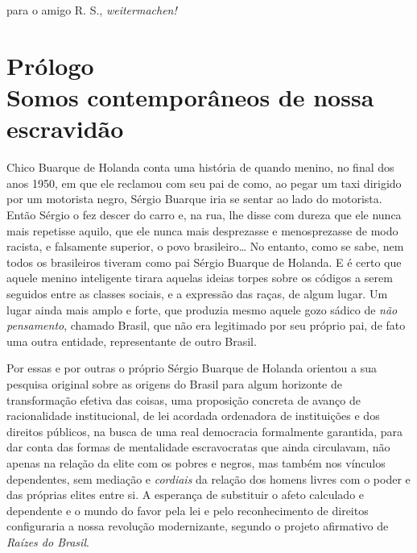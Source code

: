 \chapter*{}

\vspace*{\fill}

\thispagestyle{empty}

\begin{flushright}
para o amigo R. S., \emph{weitermachen!}
\end{flushright}

\chapter*{Prólogo\\
Somos contemporâneos de nossa escravidão}

Chico Buarque de Holanda conta uma história de quando menino, no final
dos anos 1950, em que ele reclamou com seu pai de como, ao pegar um taxi
dirigido por um motorista negro, Sérgio Buarque iria se sentar ao lado
do motorista. Então Sérgio o fez descer do carro e, na rua, lhe disse
com dureza que ele nunca mais repetisse aquilo, que ele nunca mais
desprezasse e menosprezasse de modo racista, e falsamente superior, o
povo brasileiro\ldots{} No entanto, como se sabe, nem todos os brasileiros
tiveram como pai Sérgio Buarque de Holanda. E é certo que aquele menino
inteligente tirara aquelas ideias torpes sobre os códigos a serem
seguidos entre as classes sociais, e a expressão das raças, de algum
lugar. Um lugar ainda mais amplo e forte, que produzia mesmo aquele gozo
sádico de \emph{não pensamento}, chamado Brasil, que não era legitimado
por seu próprio pai, de fato uma outra entidade, representante de outro
Brasil.

Por essas e por outras o próprio Sérgio Buarque de Holanda orientou a
sua pesquisa original sobre as origens do Brasil para algum horizonte de
transformação efetiva das coisas, uma proposição concreta de avanço de
racionalidade institucional, de lei acordada ordenadora de instituições
e dos direitos públicos, na busca de uma real democracia formalmente
garantida, para dar conta das formas de mentalidade escravocratas que
ainda circulavam, não apenas na relação da elite com os pobres e negros,
mas também nos vínculos dependentes, sem mediação e \emph{cordiais} da
relação dos homens livres com o poder e das próprias elites entre si. A
esperança de substituir o afeto calculado e dependente e o mundo do
favor pela lei e pelo reconhecimento de direitos configuraria a nossa
revolução modernizante, segundo o projeto afirmativo de \emph{Raízes do
Brasil}.

